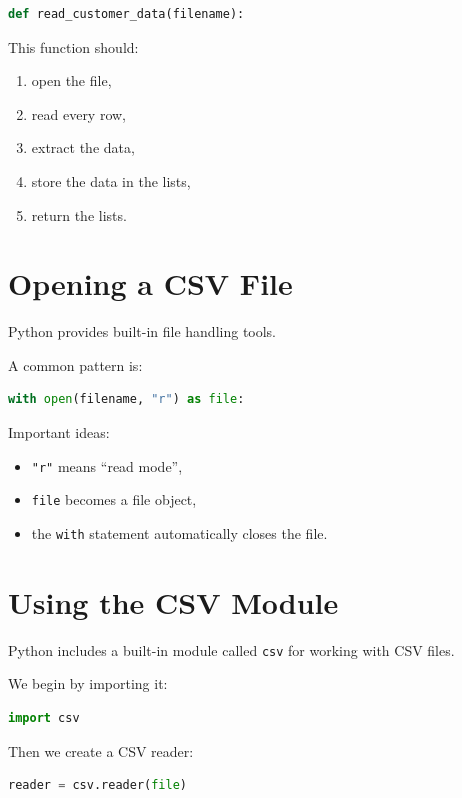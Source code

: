 \documentclass[11pt]{article}
\begin{document}
\begin{lstlisting}[language=Python]
def read_customer_data(filename):
\end{lstlisting}

This function should:

\begin{enumerate}
    \item open the file,
    \item read every row,
    \item extract the data,
    \item store the data in the lists,
    \item return the lists.
\end{enumerate}

\section{Opening a CSV File}

Python provides built-in file handling tools.

A common pattern is:

\begin{lstlisting}[language=Python]
with open(filename, "r") as file:
\end{lstlisting}

Important ideas:

\begin{itemize}
    \item \texttt{"r"} means ``read mode'',
    \item \texttt{file} becomes a file object,
    \item the \texttt{with} statement automatically closes the file.
\end{itemize}

\section{Using the CSV Module}

Python includes a built-in module called \texttt{csv} for working with CSV files.

We begin by importing it:

\begin{lstlisting}[language=Python]
import csv
\end{lstlisting}

Then we create a CSV reader:

\begin{lstlisting}[language=Python]
reader = csv.reader(file)
\end{lstlisting}
\end{document}
